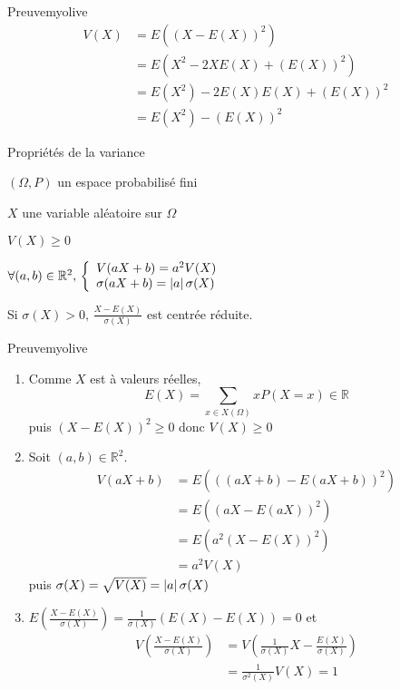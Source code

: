     \begin{demo}{Preuve}{myolive}
        \begin{align*}
            V(X) &= E\left((X-E(X))^2\right) \\
            &= E\left(X^2 - 2XE(X) + (E(X))^2\right) \\
            &= E(X^2) - 2E(X)E(X) + (E(X))^2 \\
            &= E(X^2) - (E(X))^2
        \end{align*}
    \end{demo}

    \begin{prop}{Propriétés de la variance}{}
        \begin{soient}
            \item $(\Omega,P)$ un espace probabilisé fini
            \item $X$ une variable aléatoire sur $\Omega$
        \end{soient}
        \begin{alors}
            \item $V(X) \geq 0$
            \item $\forall (a,b) \in \mathbb{R}^2, \, \et{V(aX + b) = a^2 V(X)}{\sigma(aX+b) = \abs{a}\sigma(X)}$
            \item Si $\sigma(X) > 0, \, \frac{X-E(X)}{\sigma(X)}$ est centrée réduite.
        \end{alors}
    \end{prop}

    \begin{demo}{Preuve}{myolive}
        \begin{enumerate}
            \item Comme $X$ est à valeurs réelles, 
            \[ E(X) = \sum\limits_{x \in X(\Omega)} x P(X=x) \in \mathbb{R} \] 
            puis $(X-E(X))^2 \geq 0$ donc $V(X) \geq 0$
            \item Soit $(a,b) \in \mathbb{R}^2$.
            \begin{align*}
                V(aX+b) &= E \left(((aX+b) - E(aX+b))^2\right) \\
                &= E\left((aX - E(aX))^2\right) \\
                &= E\left(a^2(X-E(X))^2\right) \\
                &= a^2 V(X)
            \end{align*}
            puis $\sigma(X) = \sqrt{V(X)} = \left\lvert a\right\rvert\sigma(X)$
            \item $E\left(\frac{X-E(X)}{\sigma(X)}\right) = \frac{1}{\sigma(X)}(E(X)-E(X)) = 0$ et 
            \begin{align*}
                V\left(\frac{X-E(X)}{\sigma(X)}\right) &= V\left(\frac{1}{\sigma(X)}X - \frac{E(X)}{\sigma(X)}\right) \\
                &= \frac{1}{\sigma^2(X)}V(X) = 1 
            \end{align*}
        \end{enumerate}
    \end{demo}

